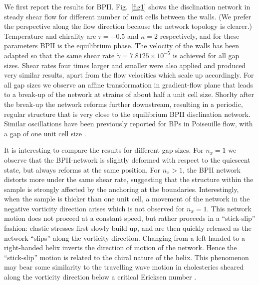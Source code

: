 \documentclass[12pt,twoside]{iopart}
\newcommand{\ex}[1]{\times10^{#1}}
\begin{document}
We first report the results for BPII.
Fig.~\ref{fig1} shows the disclination network in steady shear flow for different number of unit cells between the walls.
(We prefer the perspective along the flow direction because the network topology is clearer.)
Temperature and chirality are $\tau=-0.5$ and $\kappa=2$ respectively, and for these parameters BPII is the equilibrium phase.
The velocity of the walls has been adapted so that the same shear rate $\dot{\gamma}=7.8125\ex{-5}$ is achieved for all gap sizes.
Shear rates four times larger and smaller were also applied and produced very similar results, apart from the flow velocities which scale up accordingly.
For all gap sizes we observe an affine transformation in gradient-flow plane that leads to a break-up of the network at strains of about half a unit cell size.
Shorlty after the break-up the network reforms further downstream, resulting in a periodic, regular structure that is very close to the equilibrium
BPII disclination network. Similar oscillations have been previously reported for
BPs in Poiseuille flow, with a gap of one unit cell size \cite{Dupuis:2005}.

It is interesting to compare the results for different gap sizes.
For $n_x=1$ we observe that the BPII-network is slightly deformed with
respect to the quiescent state, but always reforms at the same position.
For $n_x > 1$, the BPII network distorts more under the same shear rate, 
suggesting that the structure within the sample is strongly affected by
the anchoring at the boundaries.
Interestingly, when the sample is thicker than one unit cell, a movement
of the network in the negative vorticity direction arises
which is not observed for $n_x=1$.
This network motion does not proceed at a constant speed, but rather
proceeds in a ``stick-slip'' fashion: elastic stresses first slowly build up,
and are then quickly released as the network ``slips'' along the vorticity
direction. Changing from a left-handed to a right-handed helix inverts the
direction of motion of the network.
Hence the ``stick-slip'' motion is related to the chiral nature of the helix.
This phenomenon may bear some similarity to the travelling wave motion in
cholesterics sheared along the vorticity direction 
below a critical Ericksen number \cite{Rey:1996a, Rey:1996b}.
\end{document}
